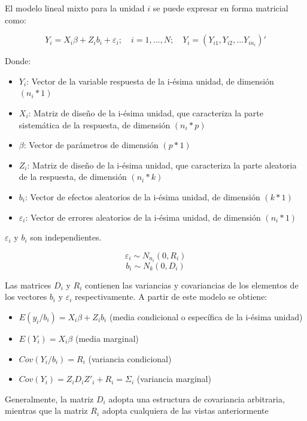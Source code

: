 \documentclass[spanish]{article}
\numberwithin{figure}{subsection}
\numberwithin{equation}{subsection}
\numberwithin{table}{subsection}
\begin{document}
El modelo lineal mixto para la unidad $i$ se puede expresar en forma matricial
como:

\[ Y_i = X_i\beta + Z_ib_i + \varepsilon_i; \quad i = 1, ..., N;
\quad Y_i = (Y_{i1}, Y_{i2}, ... Y_{in_{i}})' \]

Donde:

\begin{itemize}
	\item $Y_i$: Vector de la variable respuesta de la i-ésima unidad, de
	dimensión $(n_i*1)$
	\item $X_i$: Matriz de diseño de la i-ésima unidad, que caracteriza la
	parte sistemática de la respuesta, de dimensión $(n_i*p)$
	\item $\beta$: Vector de parámetros de dimensión $(p*1)$
	\item $Z_i$: Matriz de diseño de la i-ésima unidad, que caracteriza la
	parte aleatoria de la respuesta, de dimensión $(n_i*k)$
	\item $b_i$: Vector de efectos aleatorios de la i-ésima unidad, de
	dimensión $(k*1)$
	\item $\varepsilon_i$: Vector de errores aleatorios de la i-ésima unidad,
	de dimensión $(n_i*1)$
\end{itemize}

$\varepsilon_i$ y $b_i$ son independientes.

\[ \varepsilon_i \sim N_{n_i}(0, R_i) \]
\[ b_i \sim N_k(0, D_i) \]

Las matrices $D_i$ y $R_i$ contienen las variancias y covariancias de los
elementos de los vectores $b_i$ y $\varepsilon_i$ respectivamente. A partir de
este modelo se obtiene:

\begin{itemize}
	\item $E(y_i/b_i) = X_i\beta + Z_ib_i$ (media condicional o específica de
	la i-ésima unidad)
	\item $E(Y_i) = X_i\beta$ (media marginal)
	\item $Cov(Y_i/b_i) = R_i$ (variancia condicional)
	\item $Cov(Y_i) = Z_iD_iZ'_i + R_i = \varSigma_i$ (variancia marginal)
\end{itemize}

Generalmente, la matriz $D_i$ adopta una estructura de covariancia arbitraria,
mientras que la matriz $R_i$ adopta cualquiera de las vistas anteriormente

\end{document}
